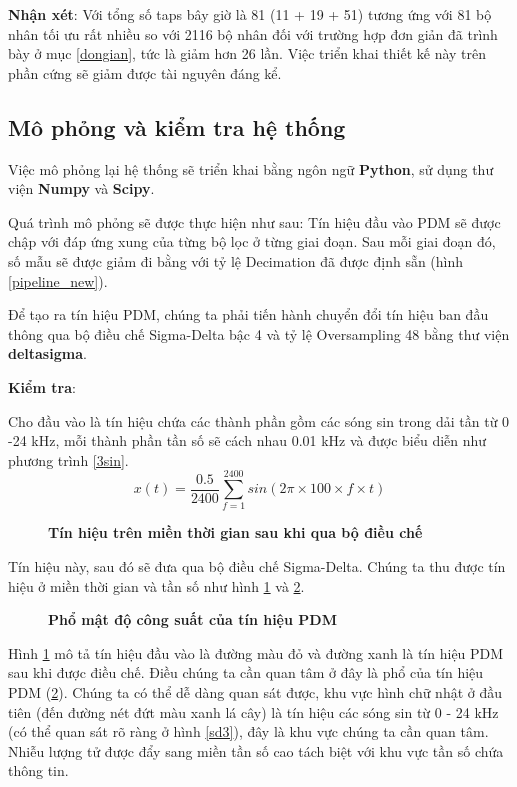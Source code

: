 \noindent \textbf{Nhận xét}: Với tổng số taps bây giờ là 81 (11 + 19 + 51) tương ứng với 81 bộ nhân tối ưu rất nhiều so với 2116 bộ nhân đối với trường hợp đơn giản đã trình bày ở mục \ref{dongian}, tức là giảm hơn 26 lần.
Việc triển khai thiết kế này trên phần cứng sẽ giảm được tài nguyên đáng kể.
\subsection{Mô phỏng và kiểm tra hệ thống}
Việc mô phỏng lại hệ thống sẽ triển khai bằng ngôn ngữ \textbf{Python}, sử dụng thư viện \textbf{Numpy} và \textbf{Scipy}.

Quá trình mô phỏng sẽ được thực hiện như sau: Tín hiệu đầu vào PDM sẽ được chập với đáp ứng xung của từng bộ lọc ở từng giai đoạn. Sau mỗi giai đoạn đó, số mẫu sẽ được giảm đi bằng với tỷ lệ Decimation đã được định sẵn (hình \ref{pipeline_new}).

Để tạo ra tín hiệu PDM, chúng ta phải tiến hành chuyển đổi tín hiệu ban đầu thông qua bộ điều chế Sigma-Delta bậc 4 và tỷ lệ Oversampling 48 bằng thư viện \textbf{deltasigma}.

\textbf{Kiểm tra}:

Cho đầu vào là tín hiệu chứa các thành phần gồm các sóng sin trong dải tần từ 0 -24 kHz, mỗi thành phần tần số sẽ cách nhau 0.01 kHz và được biểu diễn như phương trình \ref{3sin}.
\begin{equation} \label{3sin}
    x(t) = \frac{0.5}{2400}\sum^{2400}_{f = 1}sin(2\pi \times 100 \times f \times t)
\end{equation}


\begin{figure}[H]
    \centering
    
    \caption[Tín hiệu trên miền thời gian sau khi qua bộ điều chế]{\bfseries \fontsize{12pt}{0pt}\selectfont Tín hiệu trên miền thời gian sau khi qua bộ điều chế}
    \label{sd1}
\end{figure}
Tín hiệu này, sau đó sẽ đưa qua bộ điều chế Sigma-Delta. Chúng ta thu được tín hiệu ở miền thời gian và tần số như hình \ref{sd1} và \ref{sd2}.
\begin{figure}[H]
    \centering
    
    \caption[Phổ mật độ công suất của tín hiệu PDM]{\bfseries \fontsize{12pt}{0pt}\selectfont Phổ mật độ công suất của tín hiệu PDM}
    \label{sd2}
\end{figure}

Hình \ref{sd1} mô tả tín hiệu đầu vào là đường màu đỏ và đường xanh là tín hiệu PDM sau khi được điều chế. Điều chúng ta cần quan tâm ở đây là phổ của tín hiệu PDM (\ref{sd2}). Chúng ta có thể dễ dàng quan sát được, khu vực hình chữ nhật ở đầu tiên (đến đường nét đứt màu xanh lá cây) là tín hiệu các sóng sin từ 0 - 24 kHz  (có thể quan sát rõ ràng ở hình \ref{sd3}), đây là khu vực chúng ta cần quan tâm. Nhiễu lượng tử được đẩy sang miền tần số cao tách biệt với khu vực tần số chứa thông tin.

